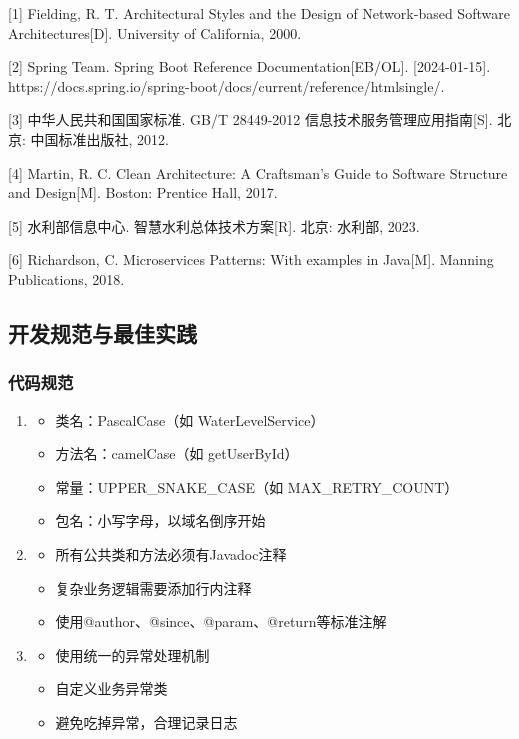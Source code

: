 {[}1{]} Fielding, R. T. Architectural Styles and the Design of Network-based Software Architectures{[}D{]}. University of California, 2000.

{[}2{]} Spring Team. Spring Boot Reference Documentation{[}EB/OL{]}. {[}2024-01-15{]}. https://docs.spring.io/spring-boot/docs/current/reference/htmlsingle/.

{[}3{]} 中华人民共和国国家标准. GB/T 28449-2012 信息技术服务管理应用指南{[}S{]}. 北京: 中国标准出版社, 2012.

{[}4{]} Martin, R. C. Clean Architecture: A Craftsman's Guide to Software Structure and Design{[}M{]}. Boston: Prentice Hall, 2017.

{[}5{]} 水利部信息中心. 智慧水利总体技术方案{[}R{]}. 北京: 水利部, 2023.

{[}6{]} Richardson, C. Microservices Patterns: With examples in Java{[}M{]}. Manning Publications, 2018.

\hypertarget{ux5f00ux53d1ux89c4ux8303ux4e0eux6700ux4f73ux5b9eux8df5}{%
\subsection{开发规范与最佳实践}\label{ux5f00ux53d1ux89c4ux8303ux4e0eux6700ux4f73ux5b9eux8df5}}

\hypertarget{ux4ee3ux7801ux89c4ux8303}{%
\subsubsection{代码规范}\label{ux4ee3ux7801ux89c4ux8303}}

\begin{enumerate}
\def\labelenumi{\arabic{enumi}.}
\item

  \begin{itemize}
  \tightlist
  \item
    类名：PascalCase（如 WaterLevelService）
  \item
    方法名：camelCase（如 getUserById）
  \item
    常量：UPPER\_SNAKE\_CASE（如 MAX\_RETRY\_COUNT）
  \item
    包名：小写字母，以域名倒序开始
  \end{itemize}
\item

  \begin{itemize}
  \tightlist
  \item
    所有公共类和方法必须有Javadoc注释
  \item
    复杂业务逻辑需要添加行内注释
  \item
    使用@author、@since、@param、@return等标准注解
  \end{itemize}
\item

  \begin{itemize}
  \tightlist
  \item
    使用统一的异常处理机制
  \item
    自定义业务异常类
  \item
    避免吃掉异常，合理记录日志
  \end{itemize}
\end{enumerate}

